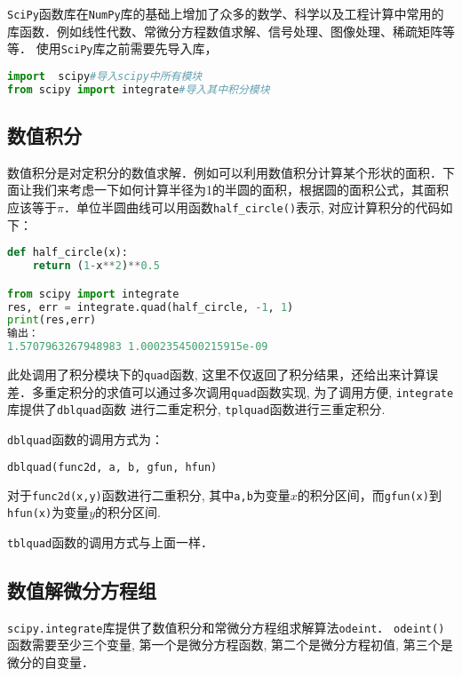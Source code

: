 \verb|SciPy|函数库在\verb|NumPy|库的基础上增加了众多的数学、科学以及工程计算中常用的库函数．例如线性代数、常微分方程数值求解、信号处理、图像处理、稀疏矩阵等等．
使用\verb|SciPy|库之前需要先导入库，
\begin{lstlisting}[language=python]
import  scipy#导入scipy中所有模块
from scipy import integrate#导入其中积分模块
\end{lstlisting}
\subsection{数值积分}
数值积分是对定积分的数值求解．例如可以利用数值积分计算某个形状的面积．下面让我们来考虑一下如何计算半径为1的半圆的面积，根据圆的面积公式，其面积应该等于$\pi$．单位半圆曲线可以用函数\verb|half_circle()|表示, 对应计算积分的代码如下：
\begin{lstlisting}[language=python]
def half_circle(x):
    return (1-x**2)**0.5

from scipy import integrate
res, err = integrate.quad(half_circle, -1, 1)
print(res,err)
输出：
1.5707963267948983 1.0002354500215915e-09
\end{lstlisting}
此处调用了积分模块下的\verb|quad|函数, 这里不仅返回了积分结果，还给出来计算误差．多重定积分的求值可以通过多次调用\verb|quad|函数实现, 为了调用方便, \verb|integrate|库提供了\verb|dblquad|函数
进行二重定积分, \verb|tplquad|函数进行三重定积分.

\verb|dblquad|函数的调用方式为：
\begin{lstlisting}[language=python]
dblquad(func2d, a, b, gfun, hfun)
\end{lstlisting}
对于\verb|func2d(x,y)|函数进行二重积分, 其中\verb|a,b|为变量$x$的积分区间，而\verb|gfun(x)|到\verb|hfun(x)|为变量$y$的积分区间.

\verb|tblquad|函数的调用方式与上面一样．

\subsection{数值解微分方程组}
\verb|scipy.integrate|库提供了数值积分和常微分方程组求解算法\verb|odeint|．
\verb|odeint()|函数需要至少三个变量, 第一个是微分方程函数, 第二个是微分方程初值, 第三个是微分的自变量．

